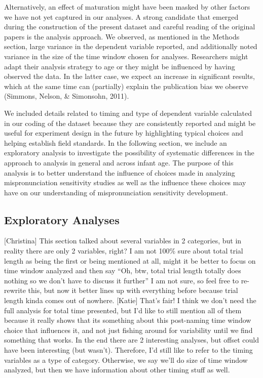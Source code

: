 \documentclass[man]{apa6}
\theoremstyle{definition}
\theoremstyle{definition}
\theoremstyle{definition}
\theoremstyle{remark}
\begin{document}
Alternatively, an effect of maturation might have been masked by other
factors we have not yet captured in our analyses. A strong candidate
that emerged during the construction of the present dataset and careful
reading of the original papers is the analysis approach. We observed, as
mentioned in the Methods section, large variance in the dependent
variable reported, and additionally noted variance in the size of the
time window chosen for analyses. Researchers might adapt their analysis
strategy to age or they might be influenced by having observed the data.
In the latter case, we expect an increase in significant results, which
at the same time can (partially) explain the publication bias we observe
(Simmons, Nelson, \& Simonsohn, 2011).

We included details related to timing and type of dependent variable
calculated in our coding of the dataset because they are consistently
reported and might be useful for experiment design in the future by
highlighting typical choices and helping establish field standards. In
the following section, we include an exploratory analysis to investigate
the possibility of systematic differences in the approach to analysis in
general and across infant age. The purpose of this analysis is to better
understand the influence of choices made in analyzing mispronunciation
sensitivity studies as well as the influence these choices may have on
our understanding of mispronunciation sensitivity development.

\subsection{Exploratory Analyses}\label{exploratory-analyses}

{[}Christina{]} This section talked about several variables in 2
categories, but in reality there are only 2 variables, right? I am not
100\% sure about total trial length as being the first or being
mentioned at all, might it be better to focus on time window analyzed
and then say \enquote{Oh, btw, total trial length totally does nothing
so we don't have to discuss it further} I am not sure, so feel free to
re-rewrite this, but now it better lines up with everything before
because trial length kinda comes out of nowhere. {[}Katie{]} That's
fair! I think we don't need the full analysis for total time presented,
but I'd like to still mention all of them because it really shows that
its something about this post-naming time window choice that influences
it, and not just fishing around for variability until we find something
that works. In the end there are 2 interesting analyses, but offset
could have been interesting (but wasn't). Therefore, I'd still like to
refer to the timing variables as a type of category. Otherwise, we say
we'll do size of time window analyzed, but then we have information
about other timing stuff as well.
\end{document}
